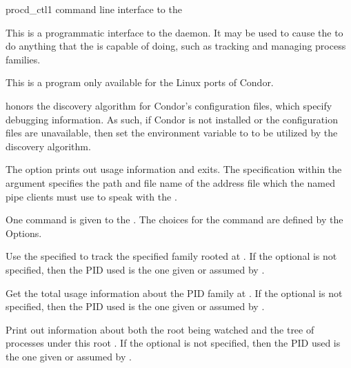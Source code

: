 \begin{ManPage}
{\label{man-procd-ctl}procd\_ctl}{1}
{command line interface to the }
\Synopsis {} 



\Description 

This is a programmatic interface to the  daemon. 
It may be used to 
cause the  to do anything that the 
is capable of doing,
such as tracking and managing process families.

This is a program only available for the Linux ports of Condor.

 honors the discovery algorithm for Condor's configuration
files, which specify debugging information.
As such, if Condor is not installed or the configuration files are
unavailable,
then set the environment variable  
to  to be utilized by the discovery algorithm.

The  option prints out usage information and exits.
The   specification within the  argument
specifies the path and file name of the address file
which the named pipe clients must use to speak with the .

One command is given to the . 
The choices for the command are defined by the Options. 

\begin{Options}

  {Use the specified  to track the specified family rooted at 
  .  
  If the optional  is not specified, 
  then the PID used is the one given or assumed by .}

  {Get the total usage information about the PID family at .
  If the optional  is not specified, 
  then the PID used is the one given or assumed by .}

  {Print out information about both the root  being watched 
  and the tree of processes under this root .
  If the optional  is not specified, 
  then the PID used is the one given or assumed by .}


\end{Options}
\end{ManPage}
